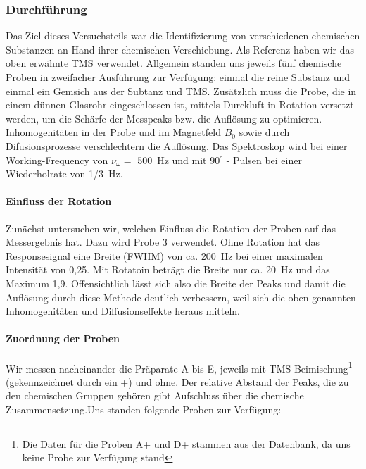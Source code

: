\documentclass[a4paper]{scrartcl} %
\begin{document}
\subsubsection{Durchführung}

Das Ziel dieses Versuchsteils war die Identifizierung von verschiedenen chemischen Substanzen an Hand ihrer chemischen Verschiebung. Als Referenz haben wir das oben erwähnte TMS verwendet. Allgemein standen uns jeweils fünf chemische Proben in zweifacher Ausführung zur Verfügung: einmal die reine Substanz und einmal ein Gemsich aus der Subtanz und TMS. Zusätzlich muss die Probe, die in einem dünnen Glasrohr eingeschlossen ist, mittels Durckluft in Rotation versetzt werden, um die Schärfe der Messpeaks bzw. die Auflösung zu optimieren. Inhomogenitäten in der Probe und im Magnetfeld $B_0$ sowie durch Difusionsprozesse verschlechtern die Auflösung. Das Spektroskop wird bei einer Working-Frequency von $\nu_{\omega} = $ \SI{500}{Hz} und mit $90^{\circ}$ - Pulsen bei einer Wiederholrate von \SI{1/3}{Hz}.

\paragraph{Einfluss der Rotation}

Zunächst untersuchen wir, welchen Einfluss die Rotation der Proben auf das Messergebnis hat. Dazu wird Probe 3 verwendet. Ohne Rotation hat das Responsesignal eine Breite (FWHM) von ca. \SI{200}{Hz} bei einer maximalen Intensität von 0,25. Mit Rotatoin beträgt die Breite nur ca. \SI{20}{Hz} und das Maximum 1,9. Offensichtlich lässt sich also die Breite der Peaks und damit die Auflösung durch diese Methode deutlich verbessern, weil sich die oben genannten Inhomogenitäten und Diffusionseffekte heraus mitteln.

\paragraph{Zuordnung der Proben}
Wir messen nacheinander die Präparate A bis E, jeweils mit TMS-Beimischung\footnote{Die Daten für die Proben A+ und D+ stammen aus der Datenbank, da uns keine Probe zur Verfügung stand} (gekennzeichnet durch ein +) und ohne. Der relative Abstand der Peaks, die zu den chemischen Gruppen gehören gibt Aufschluss über die chemische Zusammensetzung.Uns standen folgende Proben zur Verfügung:
\end{document}
